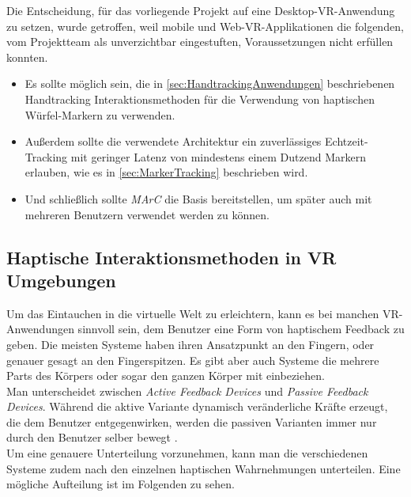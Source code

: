 Die Entscheidung, für das vorliegende Projekt auf eine Desktop-VR-Anwendung zu setzen, wurde getroffen, weil mobile und Web-VR-Applikationen die folgenden, vom Projektteam als unverzichtbar eingestuften, Voraussetzungen nicht erfüllen konnten.
\begin{itemize}
	\item Es sollte möglich sein, die in \ref{sec:HandtrackingAnwendungen} beschriebenen Handtracking Interaktionsmethoden für die Verwendung von haptischen Würfel-Markern zu verwenden.
	\item Außerdem sollte die verwendete Architektur ein zuverlässiges Echtzeit-Tracking mit geringer Latenz von mindestens einem Dutzend Markern erlauben, wie es in \ref{sec:MarkerTracking} beschrieben wird.
	\item Und schließlich sollte \emph{MArC} die Basis bereitstellen, um später auch mit mehreren Benutzern verwendet werden zu können.
\end{itemize}

\subsection{Haptische Interaktionsmethoden in VR Umgebungen}\label{sec:HaptikAnwendungen}
Um das Eintauchen in die virtuelle Welt zu erleichtern, kann es bei manchen VR-Anwendungen sinnvoll sein, dem Benutzer eine Form von haptischem Feedback zu geben. Die meisten Systeme haben ihren Ansatzpunkt an den Fingern, oder genauer gesagt an den Fingerspitzen. Es gibt aber auch Systeme die mehrere Parts des Körpers oder sogar den ganzen Körper mit einbeziehen.\\
Man unterscheidet zwischen \textit{Active Feedback Devices} und \textit{Passive Feedback Devices}. Während die aktive Variante dynamisch veränderliche Kräfte erzeugt, die dem Benutzer entgegenwirken, werden die passiven Varianten immer nur durch den Benutzer selber bewegt \cite{Haptic}.\\
Um eine genauere Unterteilung vorzunehmen, kann man die verschiedenen Systeme zudem nach den einzelnen haptischen Wahrnehmungen unterteilen. Eine mögliche Aufteilung ist im Folgenden zu sehen.

